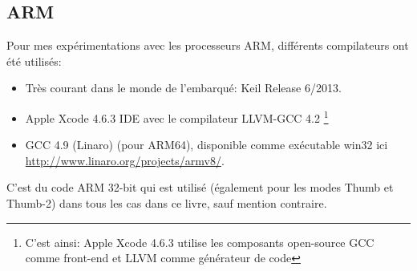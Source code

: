\subsection{ARM}
\label{sec:hw_ARM}

\myindex{\idevices}
Pour mes expérimentations avec les processeurs ARM, différents compilateurs ont été utilisés:

\begin{itemize}
\item Très courant dans le monde de l'embarqué: Keil Release 6/2013.

\item Apple Xcode 4.6.3 IDE avec le compilateur LLVM-GCC 4.2
\footnote{C'est ainsi: Apple Xcode 4.6.3 utilise les composants open-source GCC comme front-end et LLVM
comme générateur de code} %

\item GCC 4.9 (Linaro) (pour ARM64), disponible comme exécutable win32 ici \url{http://www.linaro.org/projects/armv8/}.

\end{itemize}

C'est du code ARM 32-bit qui est utilisé (également pour les modes Thumb et Thumb-2) dans tous les
cas dans ce livre, sauf mention contraire.







